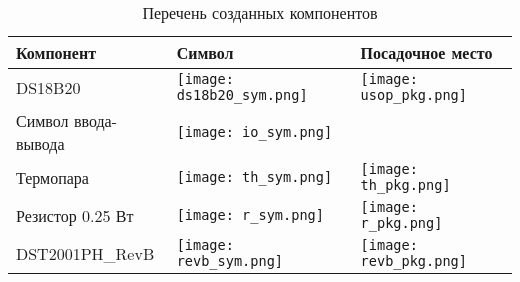 \begin{longtable}{|p{6cm}|p{6cm}|p{4cm}|}
\caption{Перечень созданных компонентов} \label{table:eagleUserLib} \\
\hline
Компонент & Символ & Посадочное место \\
\hline
\endhead
DS18B20 & \texttt{[image: ds18b20\_sym.png]} & \texttt{[image: usop\_pkg.png]}  \\
\hline
Символ ввода-вывода & \texttt{[image: io\_sym.png]} & \\
\hline
Термопара & \texttt{[image: th\_sym.png]} & \texttt{[image: th\_pkg.png]} \\
\hline
Резистор 0.25 Вт & \texttt{[image: r\_sym.png]} & \texttt{[image: r\_pkg.png]}  \\
\hline
DST2001PH\_RevB & \texttt{[image: revb\_sym.png]} & \texttt{[image: revb\_pkg.png]} \\
\hline
\end{longtable}
